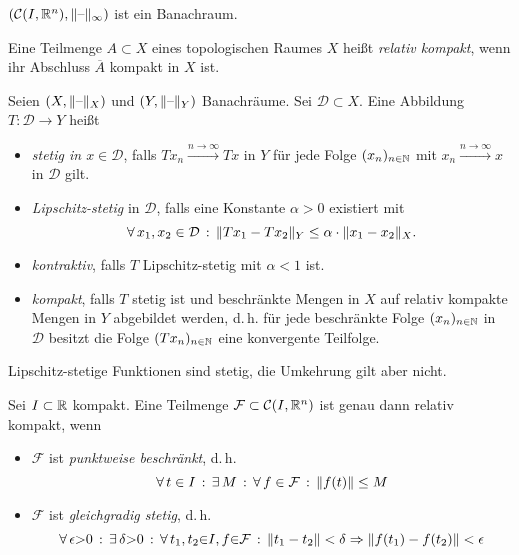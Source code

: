 \documentclass{cheat-sheet}
\newcommand{\D}{\mathcal{D}}
\begin{document}
\begin{bem}
  $(\mathcal{C}(I, \mathbb{R}^n), \lVert\text{--}\rVert_\infty)$ ist ein Banachraum.
\end{bem}

\begin{defn}
  Eine Teilmenge $A \subset X$ eines topologischen Raumes $X$ heißt \emph{relativ kompakt}, wenn ihr Abschluss $\overline{A}$ kompakt in $X$ ist.
\end{defn}

\begin{defn}
  Seien $(X, \lVert\text{--}\rVert_X)$ und $(Y, \lVert\text{--}\rVert_Y)$ Banachräume. Sei $\D \subset X$. Eine Abbildung $T : \D \to Y$ heißt
  \begin{itemize}
    \item \emph{stetig in $x \in \D$}, falls $T x_n \xrightarrow{n \to \infty} T x$ in $Y$ für jede Folge $(x_n)_{n \in \mathbb{N}}$ mit $x_n \xrightarrow{n \to \infty} x$ in $\D$ gilt.
    \item \emph{Lipschitz-stetig} in $\D$, falls eine Konstante $\alpha > 0$ existiert mit
    \[ \fa{x_1, x_2 \in \D} \norm{Tx_1 - Tx_2}_Y \leq \alpha \cdot \norm{x_1 - x_2}_X. \]
    \item \emph{kontraktiv}, falls $T$ Lipschitz-stetig mit $\alpha < 1$ ist.
    \item \emph{kompakt}, falls $T$ stetig ist und beschränkte Mengen in $X$ auf relativ kompakte Mengen in $Y$ abgebildet werden, d.\,h. für jede beschränkte Folge $(x_n)_{n \in \mathbb{N}}$ in $\D$ besitzt die Folge $(Tx_n)_{n \in \mathbb{N}}$ eine konvergente Teilfolge.
  \end{itemize}
\end{defn}

\begin{bem}
  Lipschitz-stetige Funktionen sind stetig, die Umkehrung gilt aber nicht.
\end{bem}


\begin{satz}
  Sei $I \subset \mathbb{R}$ kompakt. Eine Teilmenge $\mathcal{F} \subset \mathcal{C}(I, \mathbb{R}^n)$ ist genau dann relativ kompakt, wenn
  \begin{itemize}
    \item $\mathcal{F}$ ist \emph{punktweise beschränkt}, d.\,h.
    \[ \forall \, {t \in I} \,:\, \exists \, {M} \,:\, \forall \, {f \in \mathcal{F}} \,:\, \lVert f(t)\rVert \leq M \]
    \item $\mathcal{F}$ ist \emph{gleichgradig stetig}, d.\,h.
    \[ \forall \, {\epsilon {>} 0} \,:\, \exists \, {\delta {>} 0} \,:\, \forall \, {t_1, t_2 {\in} I, f {\in} \mathcal{F}} \,:\, \lVert t_1 - t_2\rVert < \delta \Rightarrow \lVert f(t_1) - f(t_2)\rVert < \epsilon \]
  \end{itemize}
\end{satz}
\end{document}
